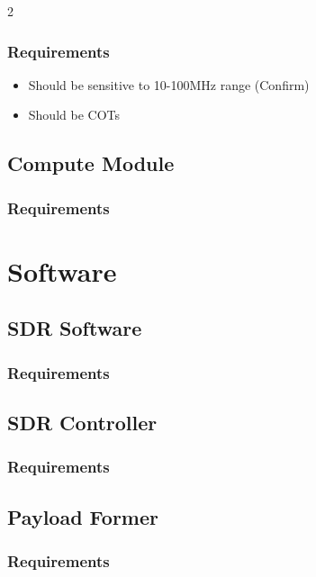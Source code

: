 \documentclass[
	a4paper, %
]{ChaosEngineReport}
\begin{document}
\begin{multicols}{2}
\subsubsection{Requirements}
\begin{itemize}
\item{Should be sensitive to 10-100MHz range (Confirm)}
\item{Should be COTs}
\end{itemize}

\subsection{Compute Module}
\subsubsection{Requirements}

\section{Software}
\subsection{SDR Software}
\subsubsection{Requirements}

\subsection{SDR Controller}
\subsubsection{Requirements}

\subsection{Payload Former}
\subsubsection{Requirements}

\newpage


\end{multicols} %

\end{document}
